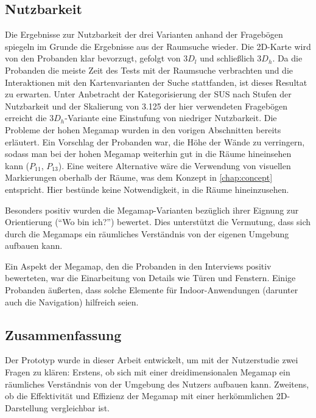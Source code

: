 \subsection{Nutzbarkeit}
Die Ergebnisse zur Nutzbarkeit der drei Varianten anhand der Fragebögen spiegeln im Grunde die Ergebnisse aus der Raumsuche wieder.
Die 2D-Karte wird von den Probanden klar bevorzugt, gefolgt von $3D_l$ und schließlich $3D_h$.
Da die Probanden die meiste Zeit des Tests mit der Raumsuche verbrachten und die Interaktionen mit den Kartenvarianten der Suche stattfanden, ist dieses Resultat zu erwarten.
Unter Anbetracht der Kategorisierung der SUS nach Stufen der Nutzbarkeit \autocite{Brooke2013} und der Skalierung von \num{3,125} der hier verwendeten Fragebögen erreicht die $3D_h$-Variante eine Einstufung von niedriger Nutzbarkeit.
Die Probleme der hohen Megamap wurden in den vorigen Abschnitten bereits erläutert.
Ein Vorschlag der Probanden war, die Höhe der Wände zu verringern, sodass man bei der hohen Megamap weiterhin gut in die Räume hineinsehen kann ($P_{11}$, $P_{13}$).
Eine weitere Alternative wäre die Verwendung von visuellen Markierungen oberhalb der Räume, was dem Konzept in \autoref{chap:concept} entspricht.
Hier bestünde keine Notwendigkeit, in die Räume hineinzusehen.

Besonders positiv wurden die Megamap-Varianten bezüglich ihrer Eignung zur Orientierung (\enquote{Wo bin ich?}) bewertet.
Dies unterstützt die Vermutung, dass sich durch die Megamaps ein räumliches Verständnis von der eigenen Umgebung aufbauen kann.

Ein Aspekt der Megamap, den die Probanden in den Interviews positiv bewerteten, war die Einarbeitung von Details wie Türen und Fenstern.
Einige Probanden äußerten, dass solche Elemente für Indoor-Anwendungen (darunter auch die Navigation) hilfreich seien.

\subsection{Zusammenfassung}
Der Prototyp wurde in dieser Arbeit entwickelt, um mit der Nutzerstudie zwei Fragen zu klären:
Erstens, ob sich mit einer dreidimensionalen Megamap ein räumliches Verständnis von der Umgebung des Nutzers aufbauen kann.
Zweitens, ob die Effektivität und Effizienz der Megamap mit einer herkömmlichen 2D-Darstellung vergleichbar ist.

